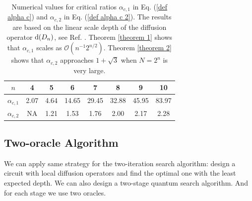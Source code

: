 \documentclass[%
 twocolumn,
 10pt,
 superscriptaddress,
 longbibliography,
 amsmath,amssymb,
 aps,
 pra,
floatfix,
]{revtex4-1}
\begin{document}
\begin{table}[h]
	\begin{ruledtabular}
		\caption{\label{Table 4} Numerical values for critical ratios $\alpha_{c,1}$ in Eq. (\ref{def alpha c}) and $\alpha_{c,2}$ in Eq. (\ref{def alpha c 2}). The results are based on the linear scale depth of the diffusion operator $\text d(D_n)$, see Ref. \cite{BBCDMSSSW95}. Theorem \ref{theorem 1} shows that $\alpha_{c,1}$ scales as $\mathcal O(n^{-1}2^{n/2})$. Theorem \ref{theorem 2} shows that $\alpha_{c,2}$ approaches $1+\sqrt 3$ when $N=2^n$ is very large.}

		\begin{tabular}{cccccccc}

			$n$            & 4    & 5    & 6     & 7     & 8     & 9     & 10    \\ \hline

			$\alpha_{c,1}$ & 2.07 & 4.64 & 14.65 & 29.45 & 32.88 & 45.95 & 83.97 \\

			$\alpha_{c,2}$ & NA   & 1.21 & 1.53  & 1.76  & 2.00  & 2.17  & 2.28  \\
		\end{tabular}

	\end{ruledtabular}
\end{table}

\subsection{Two-oracle Algorithm}

We can apply same strategy for the two-iteration search algorithm: design a circuit with local diffusion operators and find the optimal one with the least expected depth. We can also design a two-stage quantum search algorithm. And for each stage we use two oracles.
\end{document}

